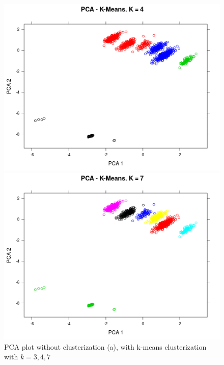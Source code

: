 \begin{figure}[h]
\begin{minipage}[h]{0.49\linewidth}
	\end{minipage}
	\begin{minipage}[h]{0.49\linewidth}
		\includegraphics[width=\linewidth]{images/kmean4}
	\end{minipage}
	\hfill
	\begin{minipage}[h]{0.49\linewidth}
		\includegraphics[width=\linewidth]{images/kmean7}
	\end{minipage}
	\caption{PCA plot without clusterization (a), with k-means clusterization with $k=3,4,7$}
	\label{fig:k-means}
\end{figure} 

